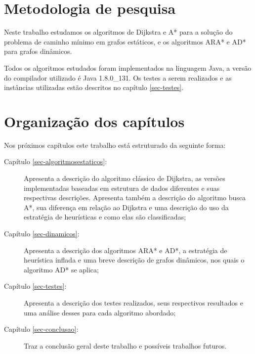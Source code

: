 \section{Metodologia de pesquisa}
\label{sec-intro-metodologia}
Neste trabalho estudamos os algoritmos de Dijkstra e A* para a solução do problema de caminho mínimo em grafos estáticos, e os algoritmos ARA* e AD* para grafos dinâmicos.

Todos os algoritmos estudados foram implementados na linguagem Java, a versão do compilador utilizado é Java 1.8.0\_131. Os testes a serem realizados e as instâncias utilizadas estão descritos no capítulo \ref{sec-testes}.
\newpage
\section{Organização dos capítulos}
\label{sec-intro-organizaocao}
Nos próximos capítulos este trabalho está estruturado da seguinte forma:
\begin{description}
\item[Capítulo \ref{sec-algoritmosestaticos}:] Apresenta a descrição do algoritmo clássico de Dijkstra, as versões implementadas baseadas em estrutura de dados diferentes e suas respectivas descrições. Apresenta também a descrição do algoritmo busca A*, sua diferença em relação ao Dijkstra e uma descrição do uso da estratégia de heurísticas e como elas são classificadas;
\item[Capítulo \ref{sec-dinamicos}:] Apresenta a descrição dos algoritmos ARA* e AD*, a estratégia de heurística inflada e uma breve descrição de grafos dinâmicos, nos quais o algoritmo AD* se aplica;
\item[Capítulo \ref{sec-testes}:] Apresenta a descrição dos testes realizados, seus respectivos resultados e uma análise desses para cada algoritmo abordado;
\item[Capítulo \ref{sec-conclusao}:] Traz a conclusão geral deste trabalho e possíveis trabalhos futuros.
\end{description}